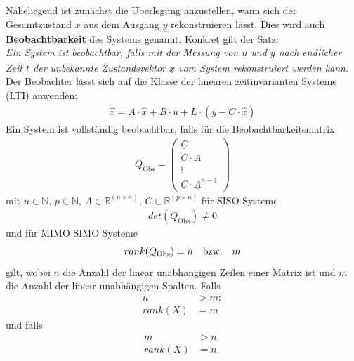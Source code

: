 Naheliegend ist zunächst die Überlegung anzustellen, wann sich der Gesamtzustand $\underline{x}$ aus dem Ausgang $\underline{y}$ rekonstruieren lässt. Dies wird auch \textbf{Beobachtbarkeit} des Systems genannt. Konkret gilt der Satz: \\
\newline
\textit{Ein System ist beobachtbar, falls mit der Messung von $\underline{u}$ und $\underline{y}$ nach endlicher Zeit $t$ der unbekannte Zustandsvektor $\underline{x}$ vom System rekonstruiert werden kann.} \\
\newline
Der Beobachter lässt sich auf die Klasse der linearen zeitinvarianten Systeme (LTI) anwenden:
\begin{align}
    \underline{\dot{\hat{x}}} = \underline{A} \cdot \underline{\hat{x}} + \underline{B} \cdot \underline{u} + \underline{L} \cdot\left( \underline{y} - C \cdot \underline{\hat{x}}\right)
\end{align}
\newline
Ein System ist vollständig beobachtbar, falls für die Beobachtbarkeitsmatrix
\begin{align}
    Q_{\mathrm{Obs}} =
    \begin{pmatrix}
        \underline{C} \\
        \underline{C} \cdot \underline{A} \\
        \vdots \\
        \underline{C} \cdot \underline{A}^{n - 1}
    \end{pmatrix}
\end{align}
\newline
mit $n\in\mathbb{N}$, $p\in\mathbb{N}$, $A\in\mathbb{R}^{(n\times n)}$, $C\in\mathbb{R}^{(p\times n)}$ für SISO Systeme
\begin{align}
    det(Q_{\mathrm{Obs}}) \neq 0
\end{align}
und für MIMO \bzw SIMO Systeme
\begin{align}
    rank(Q_{\mathrm{Obs}}) = n \quad \text{bzw.} \quad m
\end{align}
\newline
gilt, wobei $n$ die Anzahl der linear unabhängigen Zeilen einer Matrix ist und $m$ die Anzahl der linear unabhängigen Spalten. Falls
\begin{align*}
    n &> m: \\
    rank(X) &= m
\end{align*}
\newline
und falls
\begin{align*}
    m &> n: \\
    rank(X) &= n.
\end{align*}
